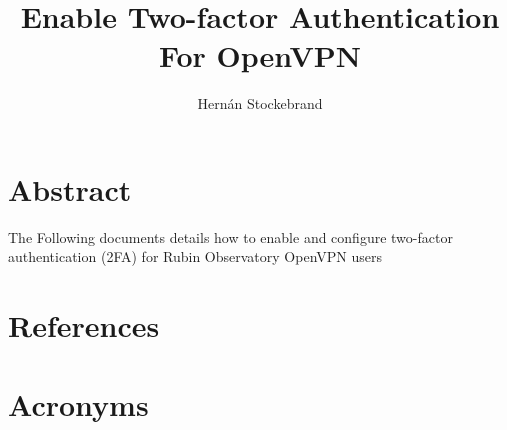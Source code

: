 \documentclass[PMO,authoryear,toc,daft]{lsstdoc}
\title{Enable Two-factor Authentication For OpenVPN}
\author{%
Hernán Stockebrand
}
\date{\vcsDate}
\begin{document}
\maketitle




\section{Abstract}
The Following documents details how to enable and configure two-factor authentication (2FA) for Rubin Observatory OpenVPN users

\appendix
\section{References} \label{sec:bib}
\renewcommand{\refname}{} %


\section{Acronyms} \label{sec:acronyms}

\end{document}
